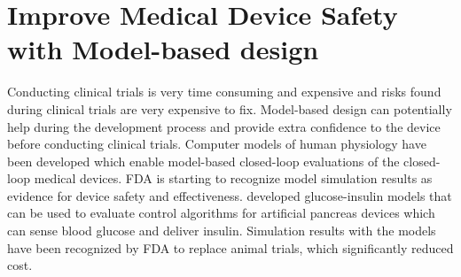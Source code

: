 \section{Improve Medical Device Safety with Model-based design}
Conducting clinical trials is very time consuming and expensive and risks found during clinical trials are very expensive to fix. Model-based design can potentially help during the development process and provide extra confidence to the device before conducting clinical trials. Computer models of human physiology have been developed which enable model-based closed-loop evaluations of the closed-loop medical devices. FDA is starting to recognize model simulation results as evidence for device safety and effectiveness. \cite{pancreas} developed glucose-insulin models that can be used to evaluate control algorithms for artificial pancreas devices which can sense blood glucose and deliver insulin. Simulation results with the models have been recognized by FDA to replace animal trials, which significantly reduced cost.

